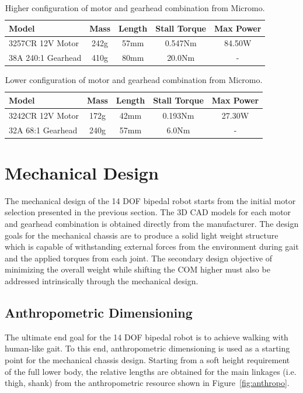 \begin{table}[!h]
  \centering
  \caption{Higher configuration of motor and gearhead combination from Micromo.}
    \begin{tabular}{lcccc}
    \addlinespace
    \toprule
    \textbf{Model} & \textbf{Mass} & \textbf{Length} & \textbf{Stall Torque} & \textbf{Max Power}\\
    \midrule
    3257CR 12V Motor	&	242g	&	57mm	&	0.547Nm		&	84.50W	\\
    38A 240:1 Gearhead	&	410g	&	80mm	&	20.0Nm		&	-	\\
    \bottomrule
    \end{tabular}%
  \label{tab:higherconfig}%
\end{table}%

\begin{table}[!h]
  \centering
  \caption{Lower configuration of motor and gearhead combination from Micromo.}
    \begin{tabular}{lcccc}
    \addlinespace
    \toprule
    \textbf{Model} & \textbf{Mass} & \textbf{Length} & \textbf{Stall Torque} & \textbf{Max Power}\\
    \midrule
    3242CR 12V Motor	&	172g	&	42mm	&	0.193Nm		&	27.30W	\\
    32A 68:1 Gearhead	&	240g	&	57mm	&	6.0Nm		&	-	\\
    \bottomrule
    \end{tabular}%
  \label{tab:lowerconfig}%
\end{table}%

\section{Mechanical Design} %
\label{sec:chassis}

The mechanical design of the 14 DOF bipedal robot starts from the initial motor selection presented in the previous section. The 3D CAD models for each motor and gearhead combination is obtained directly from the manufacturer. The design goals for the mechanical chassis are to produce a solid light weight structure which is capable of withstanding external forces from the environment during gait and the applied torques from each joint. The secondary design objective of minimizing the overall weight while shifting the COM higher must also be addressed intrinsically through the mechanical design. 

\subsection{Anthropometric Dimensioning} %
\label{sub:anthropometric_dimensioning}
The ultimate end goal for the 14 DOF bipedal robot is to achieve walking with human-like gait. To this end, anthropometric dimensioning is used as a starting point for the mechanical chassis design. Starting from a soft height requirement of the full lower body, the relative lengths are obtained for the main linkages (i.e. thigh, shank) from the anthropometric resource shown in Figure~\ref{fig:anthropo}. 

